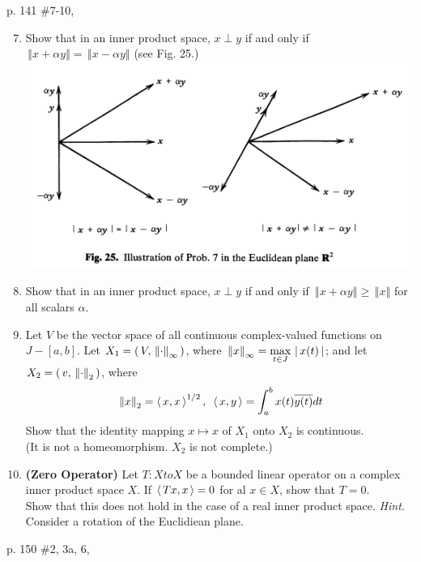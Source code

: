 \documentclass[10pt,a4paper]{report}
\newcommand{\NORM}[1]{\,\left \Vert #1 \right \Vert}
\begin{document}
\newpage
p. 141 \#7-10, 
\begin{enumerate}
	\setcounter{enumi}{6}
	\item Show that in an inner product space, $x \perp y$ if and only if $\NORM{x+\alpha y}=\NORM{x-\alpha y}$ (see Fig. 25.)\\
	\includegraphics[scale=0.8]{711_03_fig25.png} 
	
	\item Show that in an inner product space, $x \perp y$ if and only if $\NORM{x+\alpha y}\ge \NORM{x}$ for all scalars $\alpha$.
	
	\item Let $V$ be the vector space of all continuous complex-valued functions on $J-[a,b]$.  Let $X_1 = \PAREN{V, \NORM{\cdot}_\infty}$, where $\NORM{x}_\infty = \MAX{t\in J}\BARS{x(t)}$; and let $X_2 = \PAREN{v, \NORM{\cdot}_2}$, where
	\begin{align*}
		\NORM{x}_2 = \ABRACKET{x,x}^{1/2}, \text{     } \ABRACKET{x,y} = \int_a^b x(t)\CONJ{y(t)} dt
	\end{align*}  Show that the identity mapping $x \mapsto x$ of $X_1$ onto $X_2$ is continuous.\\(It is not a homeomorphism.  $X_2$ is not complete.)
	
	\item \textbf{(Zero Operator)}  Let $T: X to X$ be a bounded linear operator on a complex inner product space $X$.  If $\left \langle\, Tx,x \,\right \rangle = 0$ for al $x \in X$, show that $T=0$.\\
	Show that this does not hold in the case of a real inner product space. \textit{Hint.} Consider a rotation of the Euclidiean plane.
\end{enumerate}
\newpage
p. 150 \#2, 3a, 6, 
\end{document}
